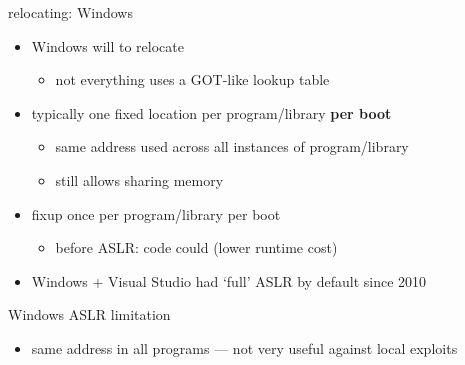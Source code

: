 
\begin{frame}{relocating: Windows}
    \begin{itemize}
        \item Windows will  to relocate
            \begin{itemize}
            \item not everything uses a GOT-like lookup table
            \end{itemize}
        \item typically one fixed location per program/library \textbf{per boot}
            \begin{itemize}
                \item same address used across all instances of program/library
                \item still allows sharing memory
            \end{itemize}
        \item fixup once per program/library per boot
            \begin{itemize}
                \item before ASLR: code could  (lower runtime cost)
            \end{itemize}
        \item Windows + Visual Studio had `full' ASLR by default since 2010
    \end{itemize}
\end{frame}

\begin{frame}{Windows ASLR limitation}
    \begin{itemize}
        \item same address in all programs --- not very useful against local exploits
    \end{itemize}
\end{frame}

